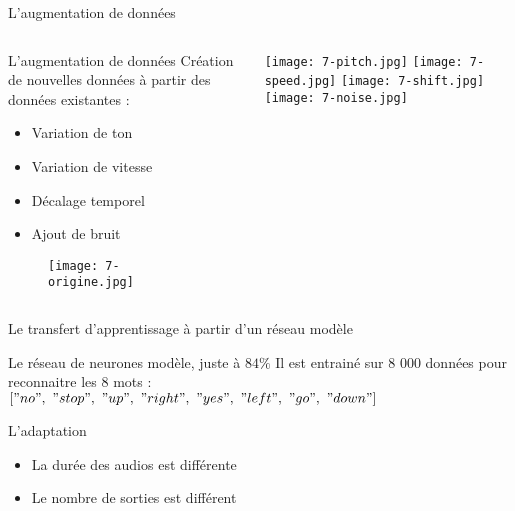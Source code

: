 \begin{frame}{L'augmentation de données}
	\begin{columns}[]
		\begin{column}[]{0.6\textwidth}
			\begin{block}{L'augmentation de données}
				Création de nouvelles données à partir des données existantes :
				\begin{itemize}
					\item Variation de ton
					\item Variation de vitesse
					\item Décalage temporel
					\item Ajout de bruit
				\end{itemize}
			\end{block}
			\begin{figure}
				\texttt{[image: 7-origine.jpg]}
			\end{figure}
		\end{column}
		\begin{column}[]{0.4\textwidth}
			\texttt{[image: 7-pitch.jpg]}
			\texttt{[image: 7-speed.jpg]}
			\texttt{[image: 7-shift.jpg]}
			\texttt{[image: 7-noise.jpg]}

		\end{column}
	\end{columns}
\end{frame}


\begin{frame}{Le transfert d'apprentissage à partir d'un réseau modèle}
	\begin{block}{Le réseau de neurones modèle, juste à $84\%$}
		Il est entrainé sur 8 000 données pour reconnaitre les $8$ mots : \\
		$["no",\ "stop",\ "up",\ "right",\ "yes",\ "left",\ "go",\ "down"]$ \\
	\end{block}
	\begin{exampleblock}{L'adaptation}
		\begin{itemize}
			\item La durée des audios est différente
			\item Le nombre de sorties est différent
		\end{itemize}
	\end{exampleblock}
\end{frame}



